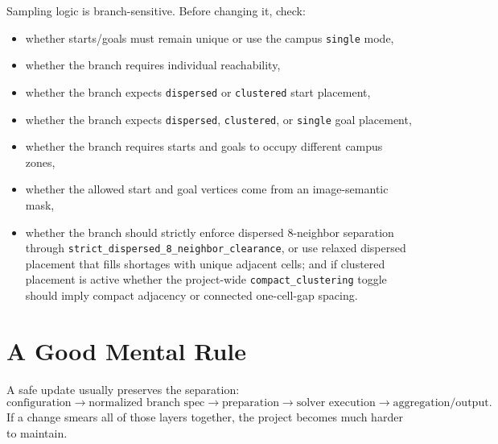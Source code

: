 \documentclass[11pt]{article}
\begin{document}
Sampling logic is branch-sensitive. Before changing it, check:
\begin{itemize}[leftmargin=2em]
    \item whether starts/goals must remain unique or use the campus \texttt{single} mode,
    \item whether the branch requires individual reachability,
    \item whether the branch expects \texttt{dispersed} or \texttt{clustered} start placement,
    \item whether the branch expects \texttt{dispersed}, \texttt{clustered}, or \texttt{single} goal placement,
    \item whether the branch requires starts and goals to occupy different campus zones,
    \item whether the allowed start and goal vertices come from an image-semantic mask,
    \item whether the branch should strictly enforce dispersed 8-neighbor separation through \texttt{strict\_dispersed\_8\_neighbor\_clearance}, or use relaxed dispersed placement that fills shortages with unique adjacent cells; and if clustered placement is active whether the project-wide \texttt{compact\_clustering} toggle should imply compact adjacency or connected one-cell-gap spacing.
\end{itemize}

\section{A Good Mental Rule}

A safe update usually preserves the separation:
\[
\text{configuration} \rightarrow \text{normalized branch spec} \rightarrow
\text{preparation} \rightarrow \text{solver execution} \rightarrow
\text{aggregation/output}.
\]
If a change smears all of those layers together, the project becomes much harder to maintain.
\end{document}
